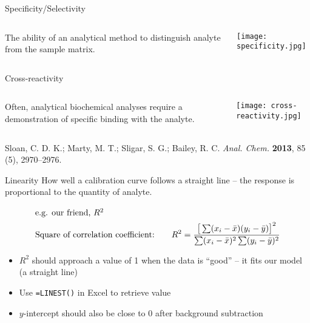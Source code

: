 \documentclass[notes=hide]{beamer}
\begin{document}
\begin{frame}{Specificity/Selectivity}
	\begin{columns}
	The ability of an analytical method to distinguish analyte from the
	sample matrix.

	\begin{center}
		\texttt{[image: specificity.jpg]}
	\end{center}
	\end{columns}

	\begin{exampleblock}{Cross-reactivity}
		\begin{columns}
			\column{0.5\linewidth}
			Often, analytical biochemical analyses 
			require a demonstration of \alert{specific
			binding} with the analyte.

			\column{0.4\linewidth}
			\centering
			\texttt{[image: cross-reactivity.jpg]}
		\end{columns}

			\tiny Sloan, C. D. K.; Marty, M. T.; Sligar, S. G.;
			Bailey, R. C. \textit{Anal. Chem.} \textbf{2013}, 85
			(5), 2970–2976.
	\end{exampleblock}
\end{frame}

\begin{frame}{Linearity}
	How well a calibration curve follows a straight line -- the response is
	\alert{proportional} to the quantity of analyte.

	\begin{align*}
		\shortintertext{e.g. our friend, $R^2$}
		\text{Square of correlation coefficient:\qquad} R^2 =
		\dfrac{\big[\sum(x_i - \bar{x})(y_i - \bar{y})\big]^2}{\sum (x_i
		- \bar{x})^2 \sum (y_i - \bar{y})^2}
	\end{align*}

	\begin{itemize}
		\item $R^2$ should approach a value of 1 when the data is
			``good'' -- it fits our model (a straight line)
		\item Use \texttt{=LINEST()} in Excel to retrieve value
		\item $y$-intercept should also be close to 0 \alert{after
			background subtraction}
	\end{itemize}
\end{frame}
\end{document}
